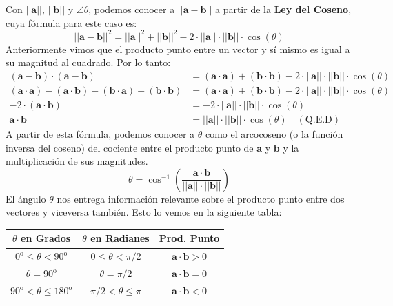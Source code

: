 \documentclass[12pt]{article}
\begin{document}
Con $||\mathbf{a}||$, $||\mathbf{b}||$ y $\angle \theta$, podemos conocer a $||\mathbf{a} - \mathbf{b}||$ a partir de la \textbf{Ley del Coseno}, cuya fórmula para este caso es:
\[
  ||\mathbf{a} - \mathbf{b}||^{2} = ||\mathbf{a}||^{2} + ||\mathbf{b}||^{2} - 2 \cdot ||\mathbf{a}|| \cdot ||\mathbf{b}|| \cdot \cos(\theta)
\]
Anteriormente vimos que el producto punto entre un vector y sí mismo es igual a su magnitud al cuadrado. Por lo tanto:
\begin{align*}
(\mathbf{a} - \mathbf{b}) \cdot (\mathbf{a} - \mathbf{b}) &=
    (\mathbf{a} \cdot \mathbf{a}) + (\mathbf{b} \cdot \mathbf{b}) - 2 \cdot ||\mathbf{a}|| \cdot ||\mathbf{b}|| \cdot \cos(\theta) \\
(\mathbf{a} \cdot \mathbf{a}) - (\mathbf{a} \cdot \mathbf{b}) - (\mathbf{b} \cdot \mathbf{a}) + (\mathbf{b} \cdot \mathbf{b}) &=
    (\mathbf{a} \cdot \mathbf{a}) + (\mathbf{b} \cdot \mathbf{b}) - 2 \cdot ||\mathbf{a}|| \cdot ||\mathbf{b}|| \cdot \cos(\theta) \\
-2 \cdot (\mathbf{a} \cdot \mathbf{b}) &= - 2 \cdot ||\mathbf{a}|| \cdot ||\mathbf{b}|| \cdot \cos(\theta) \\
\mathbf{a} \cdot \mathbf{b} &= ||\mathbf{a}|| \cdot ||\mathbf{b}|| \cdot \cos(\theta) \quad (\text{Q.E.D})
\end{align*}
A partir de esta fórmula, podemos conocer a $\theta$ como el arcocoseno (o la función inversa del coseno) del cociente entre el producto punto de $\mathbf{a}$ y $\mathbf{b}$ y la multiplicación de sus magnitudes.
\[
  \theta = \cos^{-1}\left(\frac{\mathbf{a} \cdot \mathbf{b}}{||\mathbf{a}|| \cdot ||\mathbf{b}||}\right)
\]
El ángulo $\theta$ nos entrega información relevante sobre el producto punto entre dos vectores y viceversa también. Esto lo vemos en la siguiente tabla:

\begin{table}[hbt!]

\centering

\begin{tabular}{c|c|c}
$\theta$ en Grados & $\theta$ en Radianes & Prod. Punto \\
\hline
$0^{\text{o}} \leq \theta < 90^{\text{o}}$ & $0 \leq \theta < \pi/2$ & $\mathbf{a} \cdot \mathbf{b} > 0$ \\
$\theta = 90^{\text{o}}$ & $\theta = \pi/2$ & $\mathbf{a} \cdot \mathbf{b} = 0$ \\
$90^{\text{o}} < \theta \leq 180^{\text{o}}$ & $\pi/2 < \theta \leq \pi$ & $\mathbf{a} \cdot \mathbf{b} < 0$
\end{tabular}

\end{table}
\end{document}
